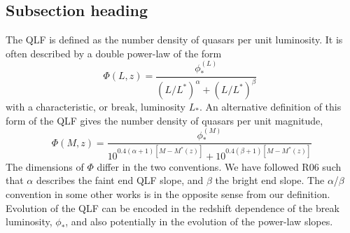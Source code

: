 \documentclass[11pt,a4paper]{article}
\begin{document}
\subsection{Subsection heading}

The QLF is defined as the number density of quasars per unit
luminosity. It is often described by a double power-law
\citep[][hereafter, R06]{Boyle00,Croom04,Richards06} of the form
\begin{equation}
  \Phi(L, z) = \frac{ \phi_{*}^{(L)} }
                            {  (L/L^{*})^{\alpha}    +  (L/L^{*})^{\beta}  }
 \ \,
 \label{eq:double_powerlaw}
\end{equation}
with a characteristic, or break, luminosity $L_{*}$.  An alternative
definition of this form of the QLF gives the number density of quasars
per unit magnitude,
\begin{equation}
  \Phi(M, z) = \frac{ \phi_{*}^{(M)} }
       { 10^{0.4{(\alpha +1)[M-M^{*}(z)]}}+10^{0.4{(\beta +1)[M-M^{*}(z) ]}} }
 \label{eq:double_powerlaw_mag}
\end{equation}
The dimensions of $\Phi$ differ in the two conventions.  We have
followed R06 such that $\alpha$ describes the faint end QLF slope, and
$\beta$ the bright end slope.  The $\alpha$/$\beta$ convention in some
other works \citep[e.g.,][]{Croom09b} is in the opposite sense from our 
definition. Evolution of the QLF can be encoded in the redshift dependence 
of the break luminosity, $\phi_{*}$, and also potentially in the evolution of
the power-law slopes.


%


\end{document}
